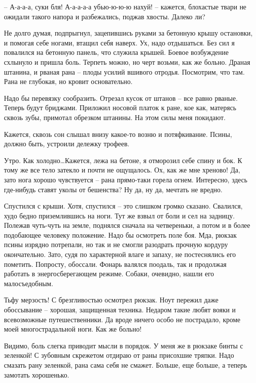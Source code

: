 \documentclass[a4paper]{book}
\begin{document}
-- А-а-а-а, суки бля! А-а-а-а-а убью-ю-ю-ю нахуй! -- кажется, блохастые твари не ожидали такого напора и разбежались, поджав хвосты. Далеко ли?

Не долго думая, подпрыгнул, зацепившись руками за бетонную крышу остановки, и помогая себе ногами, втащил себя наверх. Ух, надо отдышаться. Без сил я повалился на бетонную панель, что служила крышей. Боевое возбуждение схлынуло и пришла боль. Терпеть можно, но черт возьми, как же больно. Драная штанина, и рваная рана -- плоды усилий вшивого отродья. Посмотрим, что там. Рана не глубокая, но кровит основательно. 

Надо бы перевязку сообразить. Отрезал кусок от штанов -- все равно рваные. Теперь будут бриджами. Приложил носовой платок к ране, кое как, матерясь сквозь зубы, примотал обрезком штанины. На этом силы меня покидают.

Кажется, сквозь сон слышал внизу какое-то возню и потяфкивание. Псины, должно быть, устроили дележку трофеев.

Утро. Как холодно\ldots Кажется, лежа на бетоне, я отморозил себе спину и бок. К тому же все тело затекло и почти не ощущалось. Ох, как же мне хреново! Да, зато нога хорошо чувствуется -- рана прямо-таки горела огнем. Интересно, здесь где-нибудь ставят уколы от бешенства? Ну да, ну да, мечтать не вредно. 

Спустился с крыши. Хотя, спустился -- это слишком громко сказано. Свалился, худо бедно приземлившись на ноги. Тут же взвыл от боли и сел на задницу. Полежав чуть-чуть на земле, поднялся сначала на четвереньки, а потом и в более подобающее человеку положение. Надо бы осмотреть поле боя. Мда, рюкзак псины изрядно потрепали, но так и не смогли разодрать прочную кордуру окончательно. Зато, судя по характерной влаге и запаху, не постеснялись его пометить. Попросту, обоссали. Фонарь валялся поодаль, так и продолжая работать в энергосберегающем режиме. Собаки, очевидно, нашли его малосъедобным. 

Тьфу мерзость! С брезгливостью осмотрел рюкзак. Ноут пережил даже обоссывание -- хорошая, защищенная техника. Недаром такие любят вояки и всевозможные путешественники. Да вроде ничего особо не пострадало, кроме моей многострадальной ноги. Как же больно! 

Видимо, боль слегка приводит мысли в порядок. У меня же в рюкзаке бинты с зеленкой! С зубовным скрежетом отдираю от раны присохшие тряпки. Надо смазать рану зеленкой, рана сама себя не смажет. Больше, еще больше, а теперь замотать хорошенько.
\end{document}
